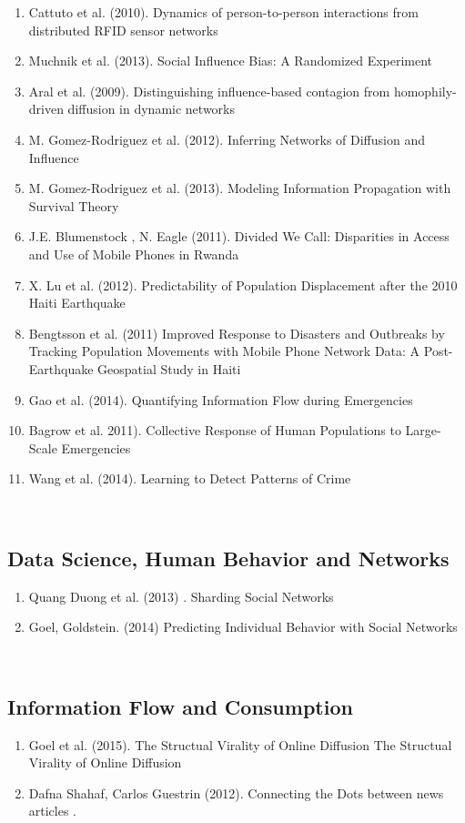 \begin{enumerate}
\item Cattuto et al. (2010). Dynamics of person-to-person interactions from distributed RFID sensor networks\cite{Cattuto_2010}
\item Muchnik et al. (2013). Social Influence Bias: A Randomized Experiment \cite{Muchnik_2013}
\item Aral et al. (2009). Distinguishing influence-based contagion from homophily-driven diffusion in dynamic networks\cite{Aral_2009}
\item M. Gomez-Rodriguez et al. (2012). Inferring Networks of Diffusion and Influence\cite{Gomez_Rodriguez_2012}
\item M. Gomez-Rodriguez et al. (2013). Modeling Information Propagation with Survival Theory\cite{rodriguez2013modeling}
\item J.E. Blumenstock , N. Eagle (2011). Divided We Call: Disparities in Access and Use of Mobile Phones in Rwanda\cite{blumenstock2012divided}
\item X. Lu et al. (2012). Predictability of Population Displacement after the 2010 Haiti Earthquake\cite{Lu_2012}
\item Bengtsson et al. (2011) Improved Response to Disasters and Outbreaks by Tracking Population Movements with Mobile Phone Network Data: A Post-Earthquake Geospatial Study in Haiti \cite{Bengtsson_2011}
\item Gao et al. (2014). Quantifying Information Flow during Emergencies\cite{Gao_2014}
\item Bagrow et al. 2011). Collective Response of Human Populations to Large-Scale Emergencies \cite{Bagrow_2011}
\item Wang et al. (2014). Learning to Detect Patterns of Crime\cite{Wang_2013}
\end{enumerate}
\\
\subsection{Data Science, Human Behavior and Networks}
\begin{enumerate}
\item Quang Duong et al. (2013) . Sharding Social Networks\cite{Duong_2013}
\item Goel,  Goldstein. (2014) Predicting Individual Behavior with Social Networks \cite{Goel_2014}
\end{enumerate}
\\
\subsection{Information Flow and Consumption}
\begin{enumerate}
\item Goel et al. (2015). The Structual Virality of Online Diffusion The Structual Virality of Online Diffusion\cite{Goel_2015}
\item Dafna Shahaf, Carlos Guestrin (2012). Connecting the Dots between news articles . \cite{Shahaf:2012:CTD:2086737.2086744} 
\end{enumerate}
\\
